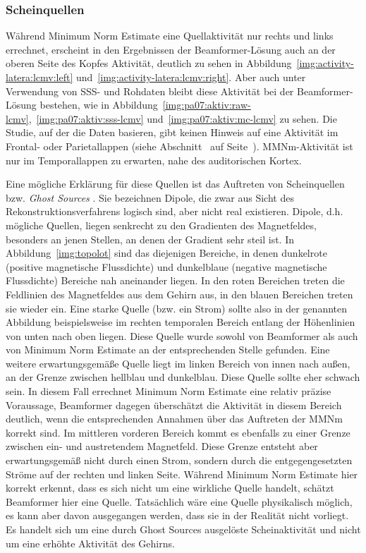 \documentclass[doc,a4paper,12pt]{apa6}
\makeatletter
\DeclareRobustCommand*{\nameref}[1]{%
      \glqq{\myorg@nameref{#1}}\grqq%
    }%
\makeatother
\begin{document}
\subsubsection{Scheinquellen}

Während Minimum Norm Estimate eine Quellaktivität nur rechts und links errechnet, erscheint in den Ergebnissen der Beamformer-Lösung auch an der oberen Seite des Kopfes Aktivität, deutlich zu sehen in Abbildung~\ref{img:activity-latera:lcmv:left} und~\ref{img:activity-latera:lcmv:right}. Aber auch unter Verwendung von SSS- und Rohdaten bleibt diese Aktivität bei der Beamformer-Lösung bestehen, wie in Abbildung~\ref{img:pa07:aktiv:raw-lcmv},~\ref{img:pa07:aktiv:sss-lcmv} und~\ref{img:pa07:aktiv:mc-lcmv} zu sehen. Die Studie, auf der die Daten basieren, gibt keinen Hinweis auf eine Aktivität im Frontal- oder Parietallappen (siehe Abschnitt~\nameref{sec:verw-daten} auf Seite~\pageref{sec:verw-daten}). MMNm-Aktivität ist nur im Temporallappen zu erwarten, nahe des auditorischen Kortex.

Eine mögliche Erklärung für diese Quellen ist das Auftreten von Scheinquellen bzw. \emph{Ghost Sources} \parencite{trujillo2004bayesian}. Sie bezeichnen Dipole, die zwar aus Sicht des Rekonstruktionsverfahrens logisch sind, aber nicht real existieren. Dipole, d.h. mögliche Quellen, liegen senkrecht zu den Gradienten des Magnetfeldes, besonders an jenen Stellen, an denen der Gradient sehr steil ist. In Abbildung~\ref{img:topolot} sind das diejenigen Bereiche, in denen dunkelrote (positive magnetische Flussdichte) und dunkelblaue (negative magnetische Flussdichte) Bereiche nah aneinander liegen. In den roten Bereichen treten die Feldlinien des Magnetfeldes aus dem Gehirn aus, in den blauen Bereichen treten sie wieder ein. Eine starke Quelle (bzw. ein Strom) sollte also in der genannten Abbildung beispielsweise im rechten temporalen Bereich entlang der Höhenlinien von unten nach oben liegen. Diese Quelle wurde sowohl von Beamformer als auch von Minimum Norm Estimate an der entsprechenden Stelle gefunden. Eine weitere erwartungsgemäße Quelle liegt im linken Bereich von innen nach außen, an der Grenze zwischen hellblau und dunkelblau. Diese Quelle sollte eher schwach sein. In diesem Fall errechnet Minimum Norm Estimate eine relativ präzise Voraussage, Beamformer dagegen überschätzt die Aktivität in diesem Bereich deutlich, wenn die entsprechenden Annahmen über das Auftreten der MMNm korrekt sind. Im mittleren vorderen Bereich kommt es ebenfalls zu einer Grenze zwischen ein- und austretendem Magnetfeld. Diese Grenze entsteht aber erwartungsgemäß nicht durch einen Strom, sondern durch die entgegengesetzten Ströme auf der rechten und linken Seite. Während Minimum Norm Estimate hier korrekt erkennt, dass es sich nicht um eine wirkliche Quelle handelt, schätzt Beamformer hier eine Quelle. Tatsächlich wäre eine Quelle physikalisch möglich, es kann aber davon ausgegangen werden, dass sie in der Realität nicht vorliegt. Es handelt sich um eine durch Ghost Sources ausgelöste Scheinaktivität und nicht um eine erhöhte Aktivität des Gehirns.
\end{document}
